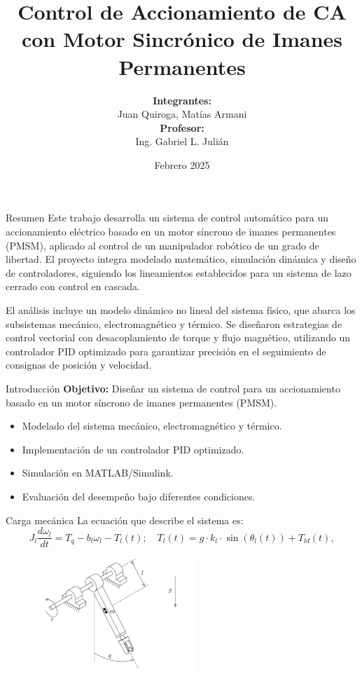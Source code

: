 \documentclass[12pt]{beamer}
\title[Proyecto Global Integrador]{
Control de Accionamiento de CA con
Motor Sincrónico de Imanes Permanentes}
\author[Quiroga, Armani]{\textbf{Integrantes: }\\Juan Quiroga, Matías Armani\\ \textbf{Profesor:}\\ Ing. Gabriel L. Julián}
\date{Febrero 2025}
\begin{document}
\frame{\titlepage}

\begin{frame}{Resumen}
Este trabajo desarrolla un sistema de control automático para un accionamiento eléctrico basado en un motor síncrono de imanes permanentes (PMSM), aplicado al control de un manipulador robótico de un grado de libertad. El proyecto integra modelado matemático, simulación dinámica y diseño de controladores, siguiendo los lineamientos establecidos para un sistema de lazo cerrado con control en cascada.

El análisis incluye un modelo dinámico no lineal del sistema físico, que abarca los subsistemas mecánico, electromagnético y térmico. Se diseñaron estrategias de control vectorial con desacoplamiento de torque y flujo magnético, utilizando un controlador PID optimizado para garantizar precisión en el seguimiento de consignas de posición y velocidad.
\end{frame}

\begin{frame}{Introducción}
\textbf{Objetivo:} Diseñar un sistema de control para un accionamiento basado en un motor síncrono de imanes permanentes (PMSM).
\begin{itemize}
    \item Modelado del sistema mecánico, electromagnético y térmico.
    \item Implementación de un controlador PID optimizado.
    \item Simulación en MATLAB/Simulink.
    \item Evaluación del desempeño bajo diferentes condiciones.
\end{itemize}
\end{frame}
\begin{frame}{Carga mecánica}
La ecuación que describe el sistema es:
\begin{equation}
        J_l \frac{d\omega_l}{dt} = T_q - b_l \omega_l - T_l(t); \quad T_l(t) = g \cdot k_l \cdot \sin(\theta_l(t)) + T_{ld}(t),
\label{eq:carga_mecanica}
\end{equation}

\begin{figure}[H]
    \centering
    \includegraphics[width=0.55\textwidth]{Imagenes/brazo_robotico.png}
    \label{fig:brazo_robotico}
\end{figure}

\end{frame}
\end{document}
